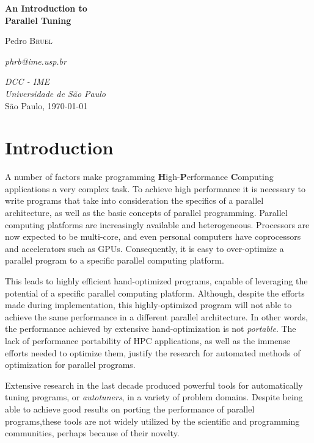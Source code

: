 \documentclass[a4paper, 12pt]{article}
\begin{document}
\hypersetup{backref,pdfpagemode=FullScreen,colorlinks=true}

\thispagestyle{empty}
\begin{center}
    \vspace*{4cm}
    \textbf{\Large{An Introduction to \\Parallel Tuning}}\\

    \vskip 1cm

    Pedro \textsc{Bruel}

    \emph{phrb@ime.usp.br}

    \vfill
    \normalsize{\emph{DCC - IME\\
    Universidade de São Paulo}\\}
    \normalsize{São Paulo, \today}
\end{center}

\newpage

\tableofcontents

\newpage

\section{Introduction} \label{sec:intro}

A number of factors make programming \textbf{H}igh-\textbf{P}erformance
\textbf{C}omputing applications a very complex task. To achieve high
performance it is necessary to write programs that take into consideration
the specifics of a parallel architecture, as well as the basic concepts
of parallel programming. Parallel computing platforms are increasingly
available and heterogeneous. Processors are now expected to be multi-core,
and even personal computers have coprocessors and accelerators such as
GPUs. Consequently, it is easy to over-optimize a parallel program to
a specific parallel computing platform.

This leads to highly efficient hand-optimized programs, capable of leveraging
the potential of a specific parallel computing platform. Although, despite the
efforts made during implementation, this highly-optimized program will not able
to achieve the same performance in a different parallel architecture. In other
words, the performance achieved by extensive hand-optimization is
not \emph{portable}. The lack of performance portability of HPC applications,
as well as the immense efforts needed to optimize them, justify the research
for automated methods of optimization for parallel programs.

Extensive research in the last decade produced powerful tools for
automatically tuning programs, or \emph{autotuners}, in a variety of problem
domains. Despite being able to achieve good results on porting the performance
of parallel programs,these tools are not widely utilized by the scientific 
and programming communities, perhaps because of their novelty.
\end{document}
